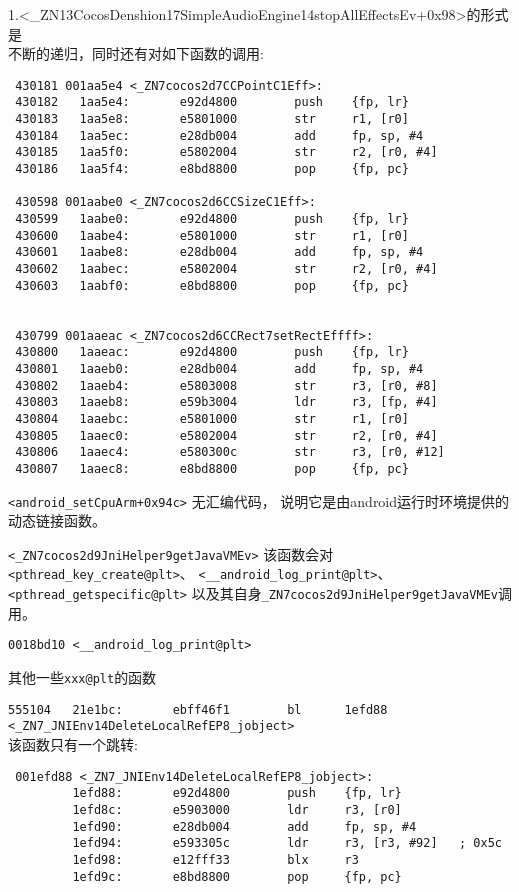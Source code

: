 1.<\_ZN13CocosDenshion17SimpleAudioEngine14stopAllEffectsEv+0x98>的形式是\\
不断的递归，同时还有对如下函数的调用:
\begin{lstlisting}
 430181 001aa5e4 <_ZN7cocos2d7CCPointC1Eff>:
 430182   1aa5e4:       e92d4800        push    {fp, lr}
 430183   1aa5e8:       e5801000        str     r1, [r0]
 430184   1aa5ec:       e28db004        add     fp, sp, #4
 430185   1aa5f0:       e5802004        str     r2, [r0, #4]
 430186   1aa5f4:       e8bd8800        pop     {fp, pc}

 430598 001aabe0 <_ZN7cocos2d6CCSizeC1Eff>:
 430599   1aabe0:       e92d4800        push    {fp, lr}
 430600   1aabe4:       e5801000        str     r1, [r0]
 430601   1aabe8:       e28db004        add     fp, sp, #4
 430602   1aabec:       e5802004        str     r2, [r0, #4]
 430603   1aabf0:       e8bd8800        pop     {fp, pc}


 430799 001aaeac <_ZN7cocos2d6CCRect7setRectEffff>:
 430800   1aaeac:       e92d4800        push    {fp, lr}
 430801   1aaeb0:       e28db004        add     fp, sp, #4
 430802   1aaeb4:       e5803008        str     r3, [r0, #8]
 430803   1aaeb8:       e59b3004        ldr     r3, [fp, #4]
 430804   1aaebc:       e5801000        str     r1, [r0]
 430805   1aaec0:       e5802004        str     r2, [r0, #4]
 430806   1aaec4:       e580300c        str     r3, [r0, #12]
 430807   1aaec8:       e8bd8800        pop     {fp, pc}
\end{lstlisting}

\verb|<android_setCpuArm+0x94c>|   无汇编代码，
说明它是由android运行时环境提供的动态链接函数。

\verb|<_ZN7cocos2d9JniHelper9getJavaVMEv>| 
该函数会对\verb|<pthread_key_create@plt>|、
\verb|<__android_log_print@plt>|、
\verb|<pthread_getspecific@plt>|
以及其自身\verb|_ZN7cocos2d9JniHelper9getJavaVMEv|调用。


\verb|0018bd10 <__android_log_print@plt>|

其他一些\verb|xxx@plt|的函数

\verb|555104   21e1bc:       ebff46f1        bl      1efd88 <_ZN7_JNIEnv14DeleteLocalRefEP8_jobject>|\\

该函数只有一个跳转:\\
\begin{lstlisting}
 001efd88 <_ZN7_JNIEnv14DeleteLocalRefEP8_jobject>:
         1efd88:       e92d4800        push    {fp, lr}
         1efd8c:       e5903000        ldr     r3, [r0]
         1efd90:       e28db004        add     fp, sp, #4
         1efd94:       e593305c        ldr     r3, [r3, #92]   ; 0x5c
         1efd98:       e12fff33        blx     r3
         1efd9c:       e8bd8800        pop     {fp, pc}
\end{lstlisting}

